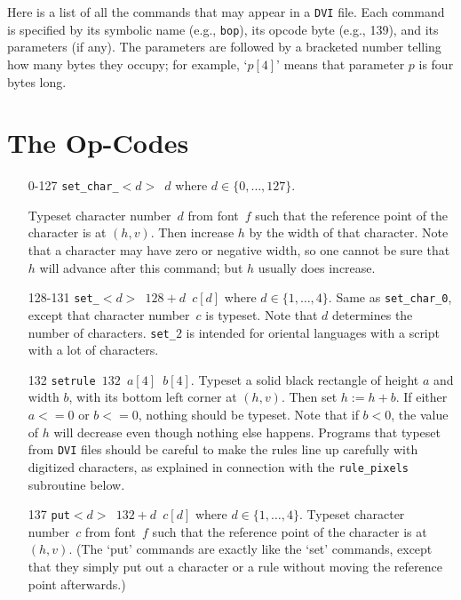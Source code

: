 \documentclass[10pt, a4paper]{article}
\begin{document}
Here is a list of all the commands that may appear in a \texttt{DVI} file. 
Each command is specified by its symbolic name (e.g., \texttt{bop}), 
its opcode byte (e.g., 139), and its parameters (if any). 
The parameters are followed by a bracketed number 
telling how many bytes they occupy; for example,
`$p[4]$' means that parameter $p$ is four bytes long. 

\section{The Op-Codes}\label{sec:opCodes}

\begin{itemize}

\item[0-127] \texttt{set\_char\_$<d>$ $d$} where $d\in\{0,\dots,127\}$. 

Typeset character number~$d$ from font~$f$ 
such that the reference point of the character is at $(h,v)$. 
Then increase $h$ by the width of that character. 
Note that a character may have zero or negative width, 
so one cannot be sure that $h$ will advance after this command; 
but $h$ usually does increase.

\item[128-131] \texttt{set\_$<d>$ $128+d$ $c[d]$} where $d\in\{1,\dots,4\}$. 
Same as \texttt{set\_char\_0}, except that character number~$c$ is typeset. 
Note that $d$ determines the number of characters. 
\texttt{set\_$2$} is intended for oriental languages 
with a script with a lot of characters. 


\item[132] \texttt{setrule $132$ $a[4]$ $b[4]$}. 
Typeset a solid black rectangle of height $a$ and width $b$, 
with its bottom left corner at $(h,v)$. 
Then set $h:=h+b$. If either $a<=0$ or $b<=0$, nothing should be typeset. 
Note that if $b<0$, the value of $h$ will decrease 
even though nothing else happens. 
Programs that typeset from \texttt{DVI} files 
should be careful to make the rules line up carefully 
with digitized characters, 
as explained in connection with the \texttt{rule\_pixels} subroutine below.

\item[137] \texttt{put$<d>$ $132+d$ $c[d]$} where $d\in\{1,\dots,4\}$. 
Typeset character number~$c$ from font~$f$
such that the reference point of the character is at $(h,v)$. 
(The `put' commands are exactly like the `set' commands, 
except that they simply put out a character or a rule 
without moving the reference point afterwards.)



\end{itemize}
\end{document}

